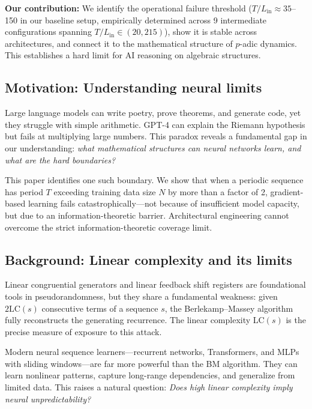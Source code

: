 \documentclass[11pt]{article}
\theoremstyle{plain}
\theoremstyle{definition}
\newcommand{\LC}{\mathrm{LC}}
\begin{document}
\textbf{Our contribution:} We identify the operational failure threshold ($T/L_{\mathrm{in}} \approx 35$--150 in our baseline setup, empirically determined across 9 intermediate configurations spanning $T/L_{\mathrm{in}} \in (20, 215)$), show it is stable across architectures, and connect it to the mathematical structure of $p$-adic dynamics. This establishes a hard limit for AI reasoning on algebraic structures.

\subsection{Motivation: Understanding neural limits}

Large language models can write poetry, prove theorems, and generate code, yet they struggle with simple arithmetic. GPT-4 can explain the Riemann hypothesis but fails at multiplying large numbers. This paradox reveals a fundamental gap in our understanding: \emph{what mathematical structures can neural networks learn, and what are the hard boundaries?}

This paper identifies one such boundary. We show that when a periodic sequence has period $T$ exceeding training data size $N$ by more than a factor of 2, gradient-based learning fails catastrophically—not because of insufficient model capacity, but due to an information-theoretic barrier. Architectural engineering cannot overcome the strict information-theoretic coverage limit.

\subsection{Background: Linear complexity and its limits}

Linear congruential generators and linear feedback shift registers are foundational tools in pseudorandomness, but they share a fundamental weakness: given $2\LC(s)$ consecutive terms of a sequence $s$, the Berlekamp--Massey algorithm~\citep{Massey1969} fully reconstructs the generating recurrence. The linear complexity $\LC(s)$ is the precise measure of exposure to this attack.

Modern neural sequence learners---recurrent networks, Transformers, and MLPs with sliding windows---are far more powerful than the BM algorithm. They can learn nonlinear patterns, capture long-range dependencies, and generalize from limited data. This raises a natural question: \emph{Does high linear complexity imply neural unpredictability?}
\end{document}
